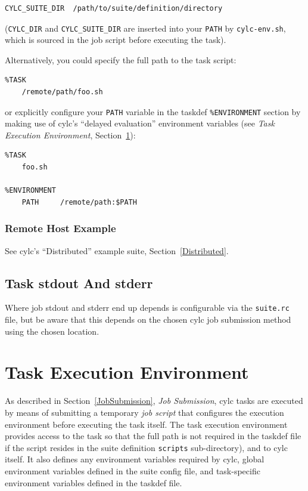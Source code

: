\documentclass[11pt,a4paper]{article}
\begin{document}
\begin{lstlisting}
CYLC_SUITE_DIR  /path/to/suite/definition/directory
\end{lstlisting}

(\lstinline=CYLC_DIR=  and \lstinline=CYLC_SUITE_DIR= are inserted
into your \lstinline=PATH= by \lstinline=cylc-env.sh=, which is sourced
in the job script before executing the task).

Alternatively, you could specify the full path to the task script:

\begin{lstlisting}
%TASK
    /remote/path/foo.sh
\end{lstlisting}

or explicitly configure your \lstinline=PATH= variable in the taskdef
\lstinline=%ENVIRONMENT= section by making use of cylc's ``delayed
evaluation'' environment variables (see {\em Task Execution
Environment}, Section~\ref{TaskExecutionEnvironment}):

\begin{lstlisting}
%TASK
    foo.sh

%ENVIRONMENT
    PATH     /remote/path:$PATH
\end{lstlisting}

\subsubsection{Remote Host Example}

See cylc's ``Distributed'' example suite, Section~\ref{Distributed}.


\subsection{Task stdout And stderr}
\label{TaskstdoutAndstderr}

Where job stdout and stderr end up depends is configurable via the
\lstinline=suite.rc= file, but be aware that this depends on the chosen
cylc job submission method using the chosen location.

\pagebreak
\section{Task Execution Environment}
\label{TaskExecutionEnvironment}

As described in Section~\ref{JobSubmission}, {\em Job Submission}, cylc
tasks are executed by means of submitting a temporary {\em job script}
that configures the execution environment before
executing the task itself. The task execution environment provides
access to the task so that the full path is not required in the
taskdef file if the script resides in the suite definition
\lstinline=scripts= sub-directory), and to cylc itself. It also
defines any environment variables required by cylc, global
environment variables defined in the suite config file, and 
task-specific environment variables defined in the taskdef file.
\end{document}
